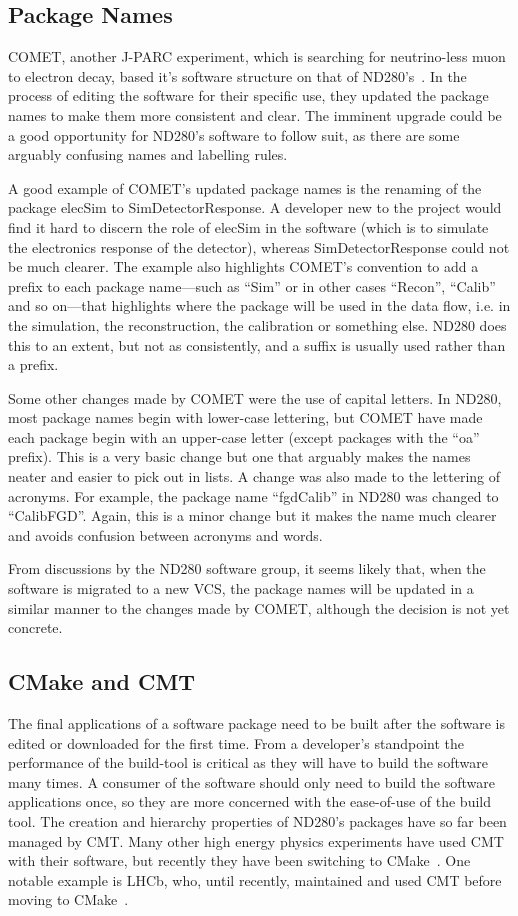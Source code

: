 \documentclass[aps,pra,12pt,notitlepage,tightenlines]{revtex4-1}
\begin{document}
\subsection{Package Names}

COMET, another J-PARC experiment, which is searching for neutrino-less muon to electron decay, based it's software structure on that of ND280's~\cite{Wu2017}. In the process of editing the software for their specific use, they updated the package names to make them more consistent and clear. The imminent upgrade could be a good opportunity for ND280's software to follow suit, as there are some arguably confusing names and labelling rules.

A good example of COMET's updated package names is the renaming of the package elecSim to SimDetectorResponse. A developer new to the project would find it hard to discern the role of elecSim in the software (which is to simulate the electronics response of the detector), whereas SimDetectorResponse could not be much clearer. The example also highlights COMET's convention to add a prefix to each package name---such as ``Sim'' or in other cases ``Recon'', ``Calib'' and so on---that highlights where the package will be used in the data flow, i.e. in the simulation, the reconstruction, the calibration or something else. ND280 does this to an extent, but not as consistently, and a suffix is usually used rather than a prefix. 

Some other changes made by COMET were the use of capital letters. In ND280, most package names begin with lower-case lettering, but COMET have made each package begin with an upper-case letter (except packages with the ``oa'' prefix). This is a very basic change but one that arguably makes the names neater and easier to pick out in lists. A change was also made to the lettering of acronyms. For example, the package name ``fgdCalib'' in ND280 was changed to ``CalibFGD''. Again, this is a minor change but it makes the name much clearer and avoids confusion between acronyms and words.

From discussions by the ND280 software group, it seems likely that, when the software is migrated to a new VCS, the package names will be updated in a similar manner to the changes made by COMET, although the decision is not yet concrete.

\subsection{CMake and CMT}
The final applications of a software package need to be built after the software is edited or downloaded for the first time. From a developer's standpoint the performance of the build-tool is critical as they will have to build the software many times. A consumer of the software should only need to build the software applications once, so they are more concerned with the ease-of-use of the build tool. The creation and hierarchy properties of ND280's packages have so far been managed by CMT. Many other high energy physics experiments have used CMT with their software, but recently they have been switching to CMake~\cite{CMake}. One notable example is LHCb, who, until recently, maintained and used CMT before moving to CMake~\cite{Clemencic2012}.
\end{document}
